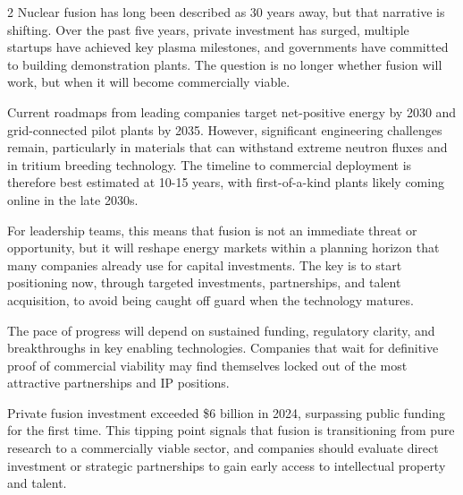 \documentclass[10pt,a4paper]{article}
\begin{document}
\begin{multicols}{2}
{\small Nuclear fusion has long been described as 30 years away, but that narrative is shifting. Over the past five years, private investment has surged, multiple startups have achieved key plasma milestones, and governments have committed to building demonstration plants. The question is no longer whether fusion will work, but when it will become commercially viable.}\par
{\small Current roadmaps from leading companies target net-positive energy by 2030 and grid-connected pilot plants by 2035. However, significant engineering challenges remain, particularly in materials that can withstand extreme neutron fluxes and in tritium breeding technology. The timeline to commercial deployment is therefore best estimated at 10-15 years, with first-of-a-kind plants likely coming online in the late 2030s.}\par
{\small For leadership teams, this means that fusion is not an immediate threat or opportunity, but it will reshape energy markets within a planning horizon that many companies already use for capital investments. The key is to start positioning now, through targeted investments, partnerships, and talent acquisition, to avoid being caught off guard when the technology matures.}\par
{\small The pace of progress will depend on sustained funding, regulatory clarity, and breakthroughs in key enabling technologies. Companies that wait for definitive proof of commercial viability may find themselves locked out of the most attractive partnerships and IP positions.}\par
{\small Private fusion investment exceeded \$6 billion in 2024, surpassing public funding for the first time. This tipping point signals that fusion is transitioning from pure research to a commercially viable sector, and companies should evaluate direct investment or strategic partnerships to gain early access to intellectual property and talent.}\par
\end{multicols}
\label{chap:1:end}
\end{document}
